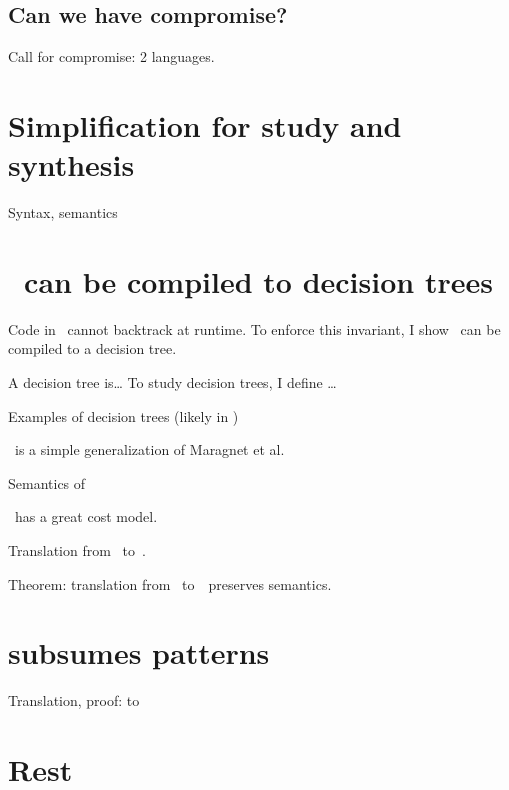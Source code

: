 \documentclass[manuscript,screen,review, 12pt, nonacm]{acmart}
\begin{document}
\begin{outline}[enumerate]






\subsection{Can we have compromise?}

Call for compromise: 2 languages. 

\section{Simplification for study and synthesis}

\1 \PPlus 
\1 \VMinus 
\1 Syntax, semantics 
\section{\VMinus\ can be compiled to decision trees}
Code in \VMinus\ cannot backtrack at runtime. To enforce this invariant, 
I show \VMinus\ can be compiled to a decision tree. 

A decision tree is\dots
To study decision trees, I define \D\dots

Examples of decision trees (likely in \D )

\D\ is a simple generalization of Maragnet et al. 

Semantics of \D 

\D\ has a great cost model. 

Translation from \VMinus\ to~\D. 

Theorem: translation from \VMinus\ to~\D\ preserves semantics. 

\section{\VMinus subsumes patterns}
\1 Translation, proof: \PPlus to \VMinus
\section{Rest}
\end{outline}
\end{document}
